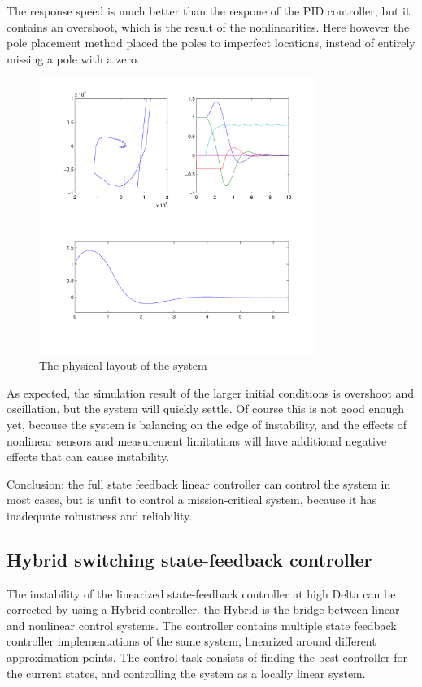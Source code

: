 The response speed is much better than the respone of the PID controller, but it contains an overshoot, which is the result of the nonlinearities. Here however the pole placement method placed the poles to imperfect locations, instead of entirely missing a pole with a zero.

\begin{figure}[H]
	\centering
	\includegraphics[width=0.8\textwidth]{img2/Lin11}
	\caption{The physical layout of the system}
	\label{fig:PhysicalLayout}
\end{figure}

As expected, the simulation result of the larger initial conditions is overshoot and oscillation, but the system will quickly settle. Of course this is not good enough yet, because the system is balancing on the edge of instability, and the effects of nonlinear sensors and measurement limitations will have additional negative effects that can cause instability.

Conclusion: the full state feedback linear controller can control the system in most cases, but is unfit to control a mission-critical system, because it has inadequate robustness and reliability.

\subsection{Hybrid switching state-feedback controller}
The instability of the linearized state-feedback controller at high Delta can be corrected by using a Hybrid controller.
the Hybrid is the bridge between linear and nonlinear control systems. The controller contains multiple state feedback controller implementations of the same system, linearized around different approximation points. The control task consists of finding the best controller for the current states, and controlling the system as a locally linear system.

